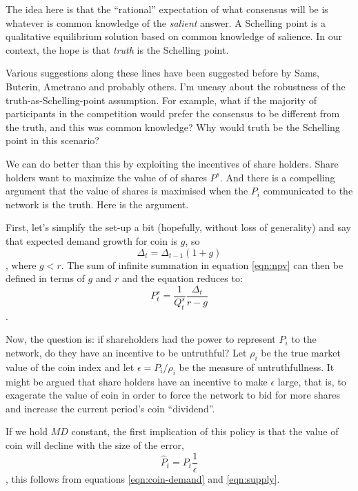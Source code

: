 \documentclass[twocolumn]{article}
\begin{document}
The idea here is that the ``rational'' expectation of what consensus
will be is whatever is common knowledge of the \emph{salient}
answer. A Schelling point is a qualitative equilibrium solution based
on common knowledge of salience. In our context, the hope is that
\emph{truth} is the Schelling point.

Various suggestions along these lines have been suggested before by
Sams\cite{sams}, Buterin\cite{buterin}, Ametrano\cite{ametrano} and
probably others. I'm uneasy about the robustness of the
truth-as-Schelling-point assumption. For example, what if the majority
of participants in the competition would prefer the consensus to be
different from the truth, and this was common knowledge? Why would
truth be the Schelling point in this scenario?

We can do better than this by exploiting the incentives of share
holders. Share holders want to maximize the value of of shares
$P^{s}$. And there is a compelling argument that the value of shares
is maximised when the $P_{i}$ communicated to the network is the
truth. Here is the argument.

First, let's simplify the set-up a bit (hopefully, without loss of
generality) and say that expected demand growth for coin is $g$, so 
\begin{equation}
\Delta_{t} = \Delta_{t-1} (1 + g)
\end{equation}, 
where $g < r$. The sum of infinite summation in equation \ref{eqn:npv}
can then be defined in terms of $g$ and $r$ and the equation reduces
to:
\begin{equation}
P^{s}_{t} = \frac{1}{Q^{s}_{t}}\frac{\Delta_{t}}{r-g}
\end{equation}.

Now, the question is: if shareholders had the power to represent
$P_{i}$ to the network, do they have an incentive to be untruthful?
Let $\rho_{i}$ be the true market value of the coin index and let
$\epsilon = P_{i} / \rho_{i}$ be the measure of untruthfullness. It
might be argued that share holders have an incentive to make
$\epsilon$ large, that is, to exagerate the value of coin in order to
force the network to bid for more shares and increase the current
period's coin ``dividend''. 

If we hold $MD$ constant, the first implication of this policy is that
the value of coin will decline with the size of the error,
\begin{equation}
\hat{P}_{t} = P_{t}\frac{1}{\epsilon}
\end{equation},
this follows from equations \ref{eqn:coin-demand} and
\ref{eqn:supply}. 
\end{document}
